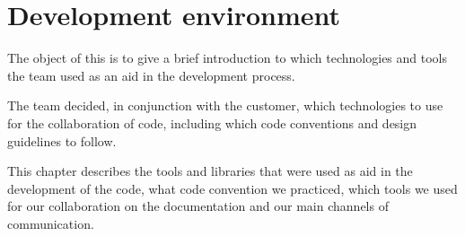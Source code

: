 \chapter{Development environment}

The object of this is to give a brief introduction to which technologies and tools the team used as an aid in the development process.

The team decided, in conjunction with the customer, which technologies to use for the collaboration of code, including which code conventions and design guidelines to follow. 

This chapter describes the tools and libraries that were used as aid in the development of the code, what code convention we practiced, which tools we used for our collaboration on the documentation and our main channels of communication.


\newpage





